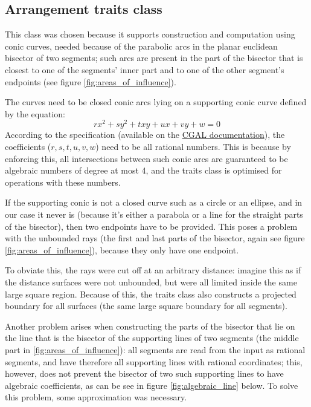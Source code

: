 \documentclass[11pt,a4paper,english]{article}
\begin{document}
	\subsection{Arrangement traits class }
	This class was chosen because it supports construction and computation using conic curves, needed because of the parabolic arcs in the planar euclidean bisector of two segments; such arcs are present in the part of the bisector that is closest to one of the segments' inner part and to one of the other segment's endpoints (see figure \ref{fig:areas_of_influence}).\par
	The curves need to be closed conic arcs lying on a supporting conic curve defined by the equation:
	\[
		rx^{2} + sy^{2} + txy + ux + vy + w = 0 
	\]
	According to the specification (available on the \href{https://doc.cgal.org/latest/Arrangement_on_surface_2/classCGAL_1_1Arr__conic__traits__2.html}{CGAL documentation}), the coefficients (\(r, s, t, u ,v, w\)) need to be all rational numbers. This is because by enforcing this, all intersections between such conic arcs are guaranteed to be algebraic numbers of degree at most 4, and the traits class is optimised for operations with these numbers.\par
	If the supporting conic is not a closed curve such as a circle or an ellipse, and in our case it never is (because it's either a parabola or a line for the straight parts of the bisector), then two endpoints have to be provided. This poses a problem with the unbounded rays (the first and last parts of the bisector, again see figure \ref{fig:areas_of_influence}), because they only have one endpoint.\par
	To obviate this, the rays were cut off at an arbitrary distance: imagine this as if the distance surfaces were not unbounded, but were all limited inside the same large square region. Because of this, the traits class  also constructs a projected boundary for all surfaces (the same large square boundary for all segments).\par
	Another problem arises when constructing the parts of the bisector that lie on the line that is the bisector of the supporting lines of two segments (the middle part in \ref{fig:areas_of_influence}): all segments are read from the input as rational segments, and have therefore all supporting lines with rational coordinates; this, however, does not prevent the bisector of two such supporting lines to have algebraic coefficients, as can be see in figure \ref{fig:algebraic_line} below. To solve this problem, some approximation was necessary.
\end{document}
